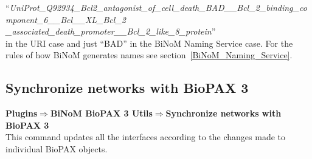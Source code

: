 “\textit{UniProt\_Q92934\_Bcl2\_antagonist\_of\_cell\_death\_BAD\_\_Bcl\_2\_binding\_component\_6\_\_Bcl\_\_XL\_Bcl\_2\\
\_associated\_death\_promoter\_\_Bcl\_2\_like\_8\_protein}”\\

in the URI case and just “BAD” in the BiNoM Naming Service case. For the rules of how BiNoM generates names see section~\ref{BiNoM_Naming_Service}.

\subsection{Synchronize networks with BioPAX 3}
\textbf{Plugins$\Rightarrow$BiNoM BioPAX 3 Utils$\Rightarrow$Synchronize networks with BioPAX 3}\\
This command updates all the interfaces according to the changes made to individual BioPAX objects.